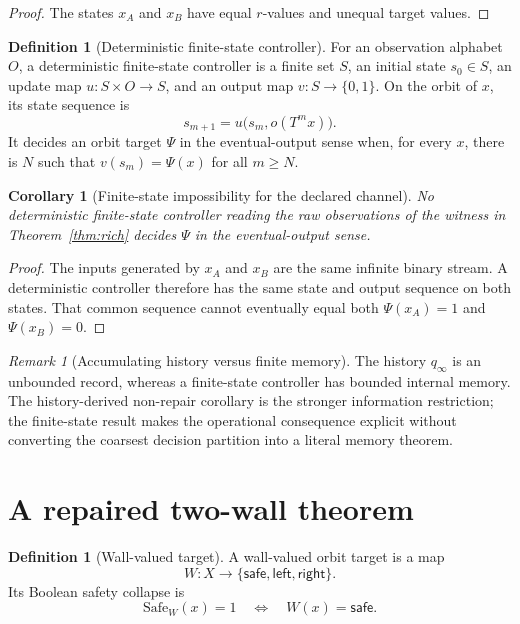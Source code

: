 \documentclass[11pt]{article}
\newcommand{\Bbits}{\ensuremath{\{0,1\}}}
\newcommand{\Xspace}{\ensuremath{X}}
\theoremstyle{plain}
\newtheorem{corollary}[theorem]{Corollary}
\theoremstyle{definition}
\newtheorem{definition}[theorem]{Definition}
\theoremstyle{remark}
\newtheorem{remark}[theorem]{Remark}
\begin{document}
\begin{proof}
The states $x_A$ and $x_B$ have equal $r$-values and unequal target values.
\end{proof}

\begin{definition}[Deterministic finite-state controller]
For an observation alphabet $O$, a deterministic finite-state controller is a
finite set $S$, an initial state $s_0\in S$, an update map
$u:S\times O\to S$, and an output map $v:S\to\Bbits$.  On the orbit of $x$,
its state sequence is
\[
s_{m+1}=u\bigl(s_m,o(T^m x)\bigr).
\]
It decides an orbit target $\Psi$ in the eventual-output sense when, for every
$x$, there is $N$ such that $v(s_m)=\Psi(x)$ for all $m\geq N$.
\end{definition}

\begin{corollary}[Finite-state impossibility for the declared channel]
No deterministic finite-state controller reading the raw observations of the
witness in Theorem~\ref{thm:rich} decides $\Psi$ in the eventual-output sense.
\end{corollary}

\begin{proof}
The inputs generated by $x_A$ and $x_B$ are the same infinite binary stream.
A deterministic controller therefore has the same state and output sequence on
both states.  That common sequence cannot eventually equal both
$\Psi(x_A)=1$ and $\Psi(x_B)=0$.
\end{proof}

\begin{remark}[Accumulating history versus finite memory]
The history $q_\infty$ is an unbounded record, whereas a finite-state controller
has bounded internal memory.  The history-derived non-repair corollary is the
stronger information restriction; the finite-state result makes the operational
consequence explicit without converting the coarsest decision partition into a
literal memory theorem.
\end{remark}

\section{A repaired two-wall theorem}
\label{sec:wall}

\begin{definition}[Wall-valued target]
A wall-valued orbit target is a map
\[
W:\Xspace\to\{\mathsf{safe},\mathsf{left},\mathsf{right}\}.
\]
Its Boolean safety collapse is
\[
\mathrm{Safe}_W(x)=1\quad\Longleftrightarrow\quad W(x)=\mathsf{safe}.
\]
\end{definition}
\end{document}
